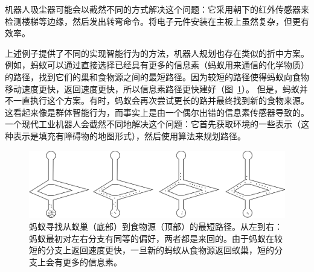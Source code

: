 
机器人吸尘器可能会以截然不同的方式解决这个问题：它采用朝下的红外传感器来检测楼梯等边缘，然后发出转弯命令。将电子元件安装在主板上虽然复杂，但更有效率。


上述例子提供了不同的实现智能行为的方法，机器人规划也存在类似的折中方案。例如，蚂蚁可以通过直接选择已经具有更多的信息素（蚂蚁用来通信的化学物质）的路径，找到它们的巢和食物源之间的最短路径。因为较短的路径使得蚂蚁向食物移动速度更快，返回速度更快，所以信息素路径更快建好（图~\ref{fig:ants}）。 但是，蚂蚁并不一直执行这个方案。有时，蚂蚁会再次尝试更长的路并最终找到新的食物来源。这看起来像是群体智能行为，而事实上是由一个偶尔出错的信息素传感器导致的。一个现代工业机器人会截然不同地解决这个问题：它首先获取环境的一些表示（这种表示是填充有障碍物的地图形式），然后使用算法来规划路径。

\begin{figure}
	\centering
		\includegraphics[width=\textwidth]{figs/ants.png}
	\caption{蚂蚁寻找从蚁巢（底部）到食物源（顶部）的最短路径。从左到右：蚂蚁最初对左右分支有同等的偏好，两者都是来回的。由于蚂蚁在较短的分支上返回速度更快，一旦新的蚂蚁从食物源返回蚁巢，短的分支上会有更多的信息素。}
	\label{fig:ants}
\end{figure}


